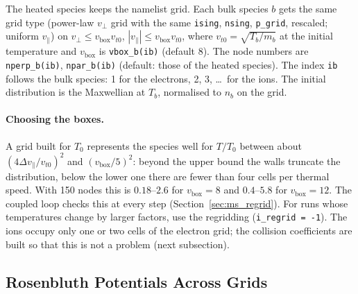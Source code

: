 \documentclass[11pt,a4paper]{article}
\newcommand{\vp}{v_\perp}
\newcommand{\vpa}{v_\parallel}
\begin{document}
The heated species keeps the namelist grid.  Each bulk species $b$ gets the same grid type (power-law
$\vp$ grid with the same \texttt{ising}, \texttt{nsing}, \texttt{p\_grid}, rescaled; uniform $\vpa$) on
$\vp\le v_\mathrm{box}v_{t0}$, $|\vpa|\le v_\mathrm{box}v_{t0}$, where $v_{t0}=\sqrt{T_b/m_b}$ at the
initial temperature and $v_\mathrm{box}$ is \texttt{vbox\_b(ib)} (default 8).  The node numbers are
\texttt{nperp\_b(ib)}, \texttt{npar\_b(ib)} (default: those of the heated species).  The index
\texttt{ib} follows the bulk species: 1 for the electrons, 2, 3, \dots\ for the ions.  The initial
distribution is the Maxwellian at $T_b$, normalised to $n_b$ on the grid.

\paragraph{Choosing the boxes.}  A grid built for $T_0$ represents the species well for
$T/T_0$ between about $(4\Delta\vpa/v_{t0})^2$ and $(v_\mathrm{box}/5)^2$: beyond the upper bound the
walls truncate the distribution, below the lower one there are fewer than four cells per thermal
speed.  With 150 nodes this is $0.18$--$2.6$ for $v_\mathrm{box}=8$ and $0.4$--$5.8$ for
$v_\mathrm{box}=12$.  The coupled loop checks this at every step (Section~\ref{sec:ms_regrid}).
For runs whose temperatures change by larger factors, use the regridding
(\texttt{i\_regrid = -1}).  The ions occupy only one or two cells of the electron grid; the
collision coefficients are built so that this is not a problem (next subsection).

\subsection{Rosenbluth Potentials Across Grids}
\end{document}
